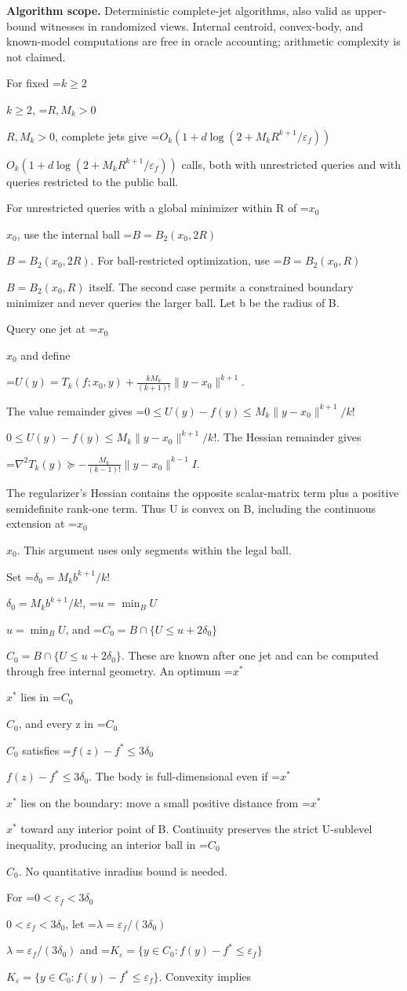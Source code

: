 \documentclass[10pt,a4paper]{article}
\newcommand{\AtlasMath}[1]{\par\begingroup\centering\setbox0=\hbox{$\displaystyle #1$}\ifdim\wd0>1.4\linewidth\typeout{ATLAS WIDE FORMULA: \the\wd0}\fi\ifdim\wd0>\linewidth\resizebox{\linewidth}{!}{\box0}\else\box0\fi\par\endgroup}
\newcommand{\AtlasInlineMath}[1]{\begingroup\setbox0=\hbox{$#1$}\ifdim\wd0>.4\linewidth\endgroup\AtlasMath{#1}\else\endgroup$#1$\fi}
\begin{document}
\textbf{Algorithm scope.} Deterministic complete-jet algorithms, also valid as upper-bound witnesses in randomized views. Internal centroid, convex-body, and known-model computations are free in oracle accounting; arithmetic complexity is not claimed.

For fixed \AtlasInlineMath{k\ge2}, \AtlasInlineMath{R,M_k>0}, complete jets give \AtlasInlineMath{O_k(1+d\log(2+M_kR^{k+1}/\varepsilon_f))} calls, both with unrestricted queries and with queries restricted to the public ball.

For unrestricted queries with a global minimizer within R of \AtlasInlineMath{x_0}, use the internal ball \AtlasInlineMath{B=B_2(x_0,2R)}. For ball-restricted optimization, use \AtlasInlineMath{B=B_2(x_0,R)} itself. The second case permits a constrained boundary minimizer and never queries the larger ball. Let b be the radius of B.

Query one jet at \AtlasInlineMath{x_0} and define

\AtlasMath{U(y)=T_k(f;x_0,y)+\frac{kM_k}{(k+1)!}\|y-x_0\|^{k+1}.}

The value remainder gives \AtlasInlineMath{0\le U(y)-f(y)\le M_k\|y-x_0\|^{k+1}/k!}. The Hessian remainder gives

\AtlasMath{\nabla^2T_k(y)\succeq-\frac{M_k}{(k-1)!}\|y-x_0\|^{k-1}I.}

The regularizer's Hessian contains the opposite scalar-matrix term plus a positive semidefinite rank-one term. Thus U is convex on B, including the continuous extension at \AtlasInlineMath{x_0}. This argument uses only segments within the legal ball.

Set \AtlasInlineMath{\delta_0=M_kb^{k+1}/k!}, \AtlasInlineMath{u=\min_B U}, and \AtlasInlineMath{C_0=B\cap\{U\le u+2\delta_0\}}. These are known after one jet and can be computed through free internal geometry. An optimum \AtlasInlineMath{x^*} lies in \AtlasInlineMath{C_0}, and every z in \AtlasInlineMath{C_0} satisfies \AtlasInlineMath{f(z)-f^*\le3\delta_0}. The body is full-dimensional even if \AtlasInlineMath{x^*} lies on the boundary: move a small positive distance from \AtlasInlineMath{x^*} toward any interior point of B. Continuity preserves the strict U-sublevel inequality, producing an interior ball in \AtlasInlineMath{C_0}. No quantitative inradius bound is needed.

For \AtlasInlineMath{0<\varepsilon_f<3\delta_0}, let \AtlasInlineMath{\lambda=\varepsilon_f/(3\delta_0)} and \AtlasInlineMath{K_\varepsilon=\{y\in C_0:f(y)-f^*\le\varepsilon_f\}}. Convexity implies
\end{document}
